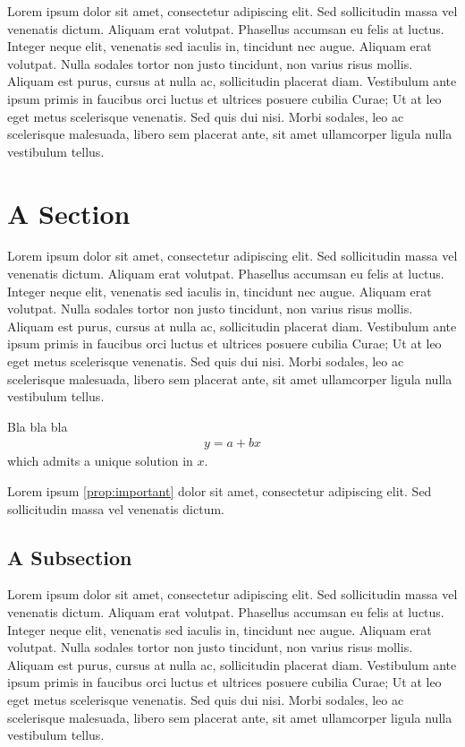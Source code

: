 Lorem  ipsum dolor sit amet, consectetur adipiscing elit. Sed sollicitudin massa vel venenatis dictum. Aliquam erat volutpat. Phasellus accumsan eu felis at luctus. Integer neque elit, venenatis sed iaculis in, tincidunt nec augue. Aliquam erat volutpat. Nulla sodales tortor non justo tincidunt, non varius risus mollis. Aliquam est purus, cursus at nulla ac, sollicitudin placerat diam. Vestibulum ante ipsum primis in faucibus orci luctus et ultrices posuere cubilia Curae; Ut at leo eget metus scelerisque venenatis. Sed quis dui nisi. Morbi sodales, leo ac scelerisque malesuada, libero sem placerat ante, sit amet ullamcorper ligula nulla vestibulum tellus.


\section{A Section} \label{sec:One}
Lorem ipsum dolor sit amet, consectetur adipiscing elit. Sed sollicitudin massa vel venenatis dictum. Aliquam erat volutpat. Phasellus accumsan eu felis at luctus. Integer neque elit, venenatis sed iaculis in, tincidunt nec augue. Aliquam erat volutpat. Nulla sodales tortor non justo tincidunt, non varius risus mollis. Aliquam est purus, cursus at nulla ac, sollicitudin placerat diam. Vestibulum ante ipsum primis in faucibus orci luctus et ultrices posuere cubilia Curae; Ut at leo eget metus scelerisque venenatis. Sed quis dui nisi. Morbi sodales, leo ac scelerisque malesuada, libero sem placerat ante, sit amet ullamcorper ligula nulla vestibulum tellus.

\begin{proposition}\label{prop:important}
	Bla bla bla
	\begin{align*}
	y=a + bx
	\end{align*}
	which admits a unique solution in $x$.
\end{proposition}
\noindent Lorem ipsum \cref{prop:important} dolor sit amet, consectetur adipiscing elit. Sed sollicitudin massa vel venenatis dictum.


\subsection{A Subsection}
Lorem ipsum dolor sit amet, consectetur adipiscing elit. Sed sollicitudin massa vel venenatis dictum. Aliquam erat volutpat. Phasellus accumsan eu felis at luctus. Integer neque elit, venenatis sed iaculis in, tincidunt nec augue. Aliquam erat volutpat. Nulla sodales tortor non justo tincidunt, non varius risus mollis. Aliquam est purus, cursus at nulla ac, sollicitudin placerat diam. Vestibulum ante ipsum primis in faucibus orci luctus et ultrices posuere cubilia Curae; Ut at leo eget metus scelerisque venenatis. Sed quis dui nisi. Morbi sodales, leo ac scelerisque malesuada, libero sem placerat ante, sit amet ullamcorper ligula nulla vestibulum tellus.

